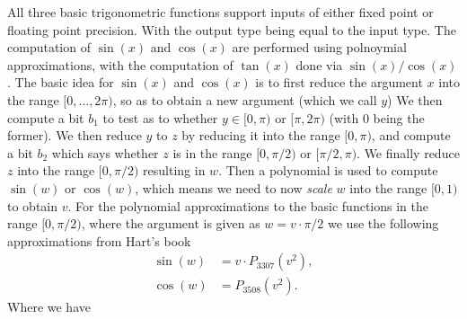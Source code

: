   All three basic trigonometric functions support inputs of either
  fixed point or floating point precision.
  With the output type being equal to the input type.
  The computation of $\sin(x)$ and $\cos(x)$ are performed
  using polnoymial approximations, with the computation of $\tan(x)$
  done via $\sin(x)/\cos(x)$.
  The basic idea for $\sin(x)$ and $\cos(x)$ is to first reduce
  the argument $x$ into the range $[0,\ldots,2 \pi)$, so
  as to obtain a new argument (which we call $y$)
  We then compute a bit $b_1$ to test as to whether
$y \in [0,\pi)$ or $[\pi,2 \pi)$ (with $0$ being
  the former).
  We then reduce $y$ to $z$ by reducing it into the range
$[0,\pi)$, and compute a bit $b_2$ which says whether
$z$ is in the range $[0,\pi/2)$ or $[\pi/2,\pi)$.
  We finally reduce $z$ into the range $[0,\pi/2)$ resulting
  in $w$.
  Then a polynomial is used to compute
$\sin(w)$ or $\cos(w)$, which means
  we need to now {\em scale} $w$ into the range $[0,1)$
  to obtain $v$.
  For the polynomial approximations to the basic functions in
  the range $[0,\pi/2)$, where the argument is given as $w = v \cdot \pi/2$
  we use the following approximations from Hart's book \cite{Hart:1978:CA:540084}
  \begin{align*}
    \sin(w) & = v \cdot P_{3307}(v^2), \\
    \cos(w) & = P_{3508}(v^2).
  \end{align*}
  Where we have
